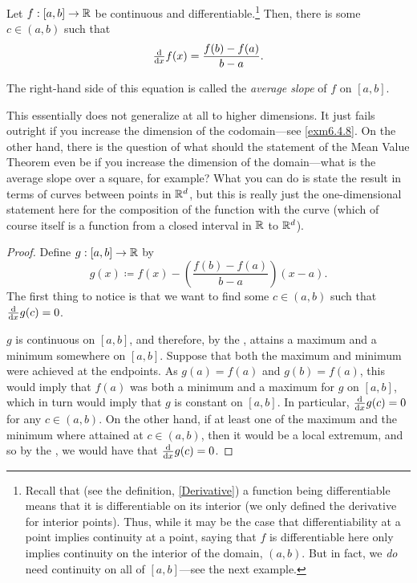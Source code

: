\begin{thm}\label{MeanValueTheorem}
Let $f:[a,b]\rightarrow \mathbb{R}$ be continuous and differentiable.\footnote{Recall that (see the definition, \cref{Derivative}) a function being differentiable means that it is differentiable on its interior (we only defined the derivative for interior points).  Thus, while it may be the case that differentiability at a point implies continuity at a point, saying that $f$ is differentiable here only implies continuity on the interior of the domain, $(a,b)$.  But in fact, we \emph{do} need continuity on all of $[a,b]$---see the next example.}  Then, there is some $c\in (a,b)$ such that
\begin{equation}
\tfrac{\mathop{}\!\mathrm{d}}{\mathop{}\!\mathrm{d} x}f(x)=\frac{f(b)-f(a)}{b-a}.
\end{equation}
\begin{rmk}
The right-hand side of this equation is called the \emph{average slope} of $f$ on $[a,b]$.
\end{rmk}
\begin{rmk}
This essentially does not generalize at all to higher dimensions.  It just fails outright if you increase the dimension of the codomain---see \cref{exm6.4.8}.  On the other hand, there is the question of what should the statement of the Mean Value Theorem even be if you increase the dimension of the domain---what is the average slope over a square, for example?  What you can do is state the result in terms of curves between points in $\mathbb{R} ^d$, but this is really just the one-dimensional statement here for the composition of the function with the curve (which of course itself is a function from a closed interval in $\mathbb{R}$ to $\mathbb{R} ^d$).
\end{rmk}
\begin{proof}
Define $g:[a,b]\rightarrow \mathbb{R}$ by
\begin{equation}
g(x)\coloneqq f(x)-\left( \frac{f(b)-f(a)}{b-a}\right) (x-a).
\end{equation}
The first thing to notice is that we want to find some $c\in (a,b)$ such that $\frac{\mathop{}\!\mathrm{d}}{\mathop{}\!\mathrm{d} x}g(c)=0$.

$g$ is continuous on $[a,b]$, and therefore, by the , attains a maximum and a minimum somewhere on $[a,b]$.  Suppose that both the maximum and minimum were achieved at the endpoints.  As $g(a)=f(a)$ and $g(b)=f(a)$, this would imply that $f(a)$ was both a minimum and a maximum for $g$ on $[a,b]$, which in turn would imply that $g$ is constant on $[a,b]$.  In particular, $\frac{\mathop{}\!\mathrm{d}}{\mathop{}\!\mathrm{d} x}g(c)=0$ for any $c\in (a,b)$.  On the other hand, if at least one of the maximum and the minimum where attained at $c\in (a,b)$, then it would be a local extremum, and so by the , we would have that $\frac{\mathop{}\!\mathrm{d}}{\mathop{}\!\mathrm{d} x}g(c)=0$.
\end{proof}
\end{thm}

